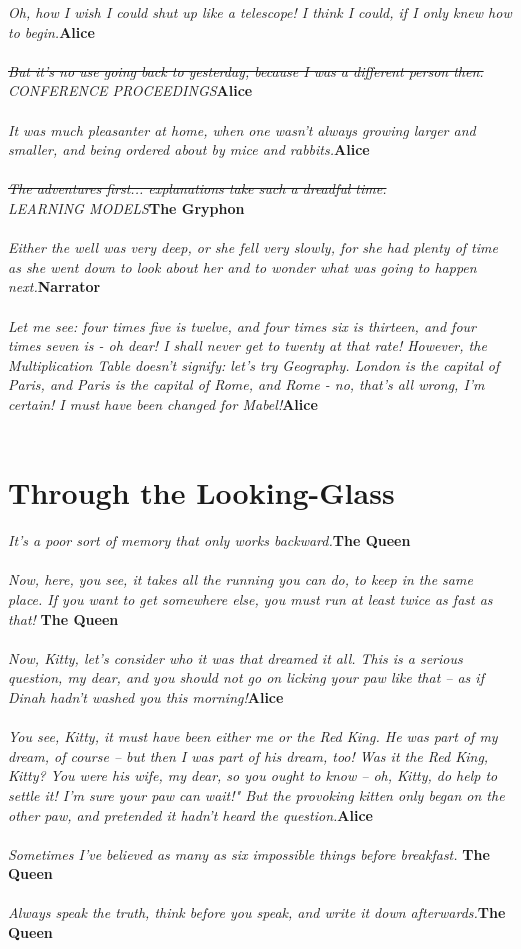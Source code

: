 \documentclass{hi-thesis}
\renewcommand{\quote}[2]{\noindent \emph{#2}\hfill{\bf #1}\\\\}
\begin{document}
\quote{Alice}{Oh, how I wish I could shut up like a telescope! I think I could, if I only knew how to begin.}
\quote{Alice}{\st{But it's no use going back to yesterday, because I was a different person then.}\\CONFERENCE PROCEEDINGS}
\quote{Alice}{It was much pleasanter at home, when one wasn't always growing larger and smaller, and being ordered about by mice and rabbits.}
\quote{The Gryphon}{\st{The adventures first... explanations take such a dreadful time.}\\LEARNING MODELS}
\quote{Narrator}{Either the well was very deep, or she fell very slowly, for she had plenty of time as she went down to look about her and to wonder what was going to happen next.}
\quote{Alice}{Let me see: four times five is twelve, and four times six is thirteen, and four times seven is - oh dear! I shall never get to twenty at that rate! However, the Multiplication Table doesn't signify: let's try Geography. London is the capital of Paris, and Paris is the capital of Rome, and Rome - no, that's all wrong, I'm certain! I must have been changed for Mabel!}



\chapter*{Through the Looking-Glass}
\quote{The Queen}{It's a poor sort of memory that only works backward.}
\quote{The Queen}{Now, here, you see, it takes all the running you can do, to keep in the same place. If you want to get somewhere else, you must run at least twice as fast as that! }
\quote{Alice}{Now, Kitty, let's consider who it was that dreamed it all. This is a serious question, my dear, and you should not go on licking your paw like that -- as if Dinah hadn't washed you this morning!}
\quote{Alice}{You see, Kitty, it must have been either me or the Red King. He was part of my dream, of course -- but then I was part of his dream, too! Was it the Red King, Kitty? You were his wife, my dear, so you ought to know -- oh, Kitty, do help to settle it! I'm sure your paw can wait!" But the provoking kitten only began on the other paw, and pretended it hadn't heard the question.}
\quote{The Queen}{Sometimes I've believed as many as six impossible things before breakfast. }
\quote{The Queen}{Always speak the truth, think before you speak, and write it down afterwards.}






\nocite{lookingglass,alice}
 

\end{document}
